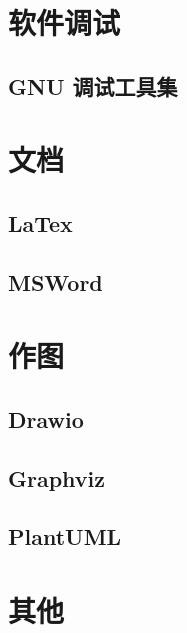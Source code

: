 \section{软件调试}
\subsection{GNU 调试工具集}

\section{文档}
\subsection{LaTex}
\subsection{MSWord}

\section{作图}
\subsection{Drawio}
\subsection{Graphviz}
\subsection{PlantUML}

\section{其他}
